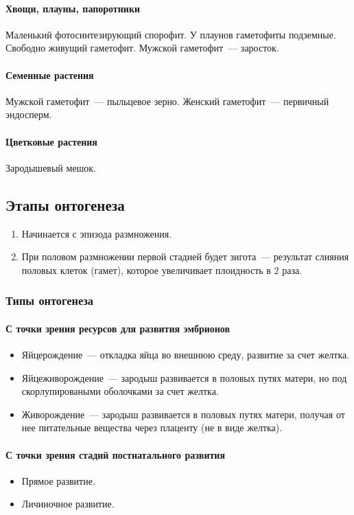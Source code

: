 \documentclass[12pt]{article}
\begin{document}
	\paragraph{Хвощи, плауны, папоротники} Маленький фотосинтезирующий спорофит. У плаунов гаметофиты подземные. Свободно живущий гаметофит. Мужской гаметофит~--- заросток.
	\paragraph{Семенные растения} Мужской гаметофит~--- пыльцевое зерно. Женский гаметофит~--- первичный эндосперм.
	\paragraph{Цветковые растения} Зародышевый мешок.
	
	\subsection{Этапы онтогенеза}
	\begin{enumerate}
		\item Начинается с эпизода размножения.
		\item При половом размножении первой стадией будет зигота~--- результат слияния половых клеток (гамет), которое увеличивает плоидность в 2 раза.
	\end{enumerate}
	\subsubsection{Типы онтогенеза}
	\paragraph{С точки зрения ресурсов для развития эмбрионов}
	\begin{itemize}
		\item Яйцерождение~--- откладка яйца во внешнюю среду, развитие за счет желтка.
		\item Яйцеживорождение~--- зародыш развивается в половых путях матери, но под скорлупироваными оболочками за счет желтка.
		\item Живорождение~--- зародыш развивается в половых путях матери, получая от нее питательные вещества через плаценту (не в виде желтка).
	\end{itemize}
	\paragraph{С точки зрения стадий постнатального развития}
	\begin{itemize}
		\item Прямое развитие.
		\item Личиночное развитие.
	\end{itemize}
\end{document}
